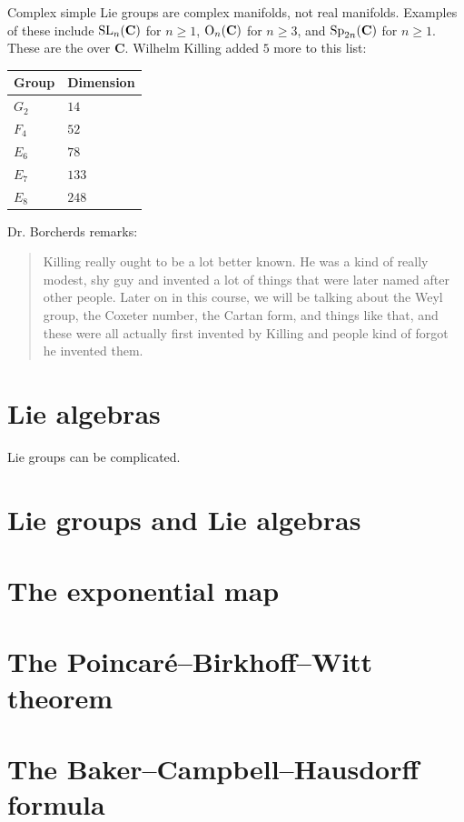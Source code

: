 \documentclass [11 pt, oneside] {article}
\begin{document}
Complex simple Lie groups are complex manifolds, not real manifolds. Examples of these include $\operatorname{SL}_{n}(\mathbf{C})$ for $n\ge 1$, $\operatorname{O}_{n}(\mathbf{C})$ for $n\ge 3$, and $\operatorname{Sp}_{2n}(\mathbf{C})$ for $n\ge 1$. These are the  over $\mathbf{C}$.
Wilhelm Killing added $5$ more to this list:
\begin{center}
\begin{tabular}{ll}
    Group & Dimension\\
    \midrule
    $G_2$ & $14$\\
    $F_4$ & $52$\\
    $E_6$ & $78$\\
    $E_7$ & $133$\\
    $E_8$ & $248$
\end{tabular}
\end{center}
Dr. Borcherds remarks:
\begin{quote}
	\small Killing really ought to be a lot better known. He was a kind of really modest, shy guy and invented a lot of things that were later named after other people. Later on in this course, we will be talking about the Weyl group, the Coxeter number, the Cartan form, and things like that, and these were all actually first invented by Killing and people kind of forgot he invented them.
\end{quote}

\section {Lie algebras}
Lie groups can be complicated.

\iffalse
\section {Lie groups and Lie algebras}

\section {The exponential map}

\section {The Poincar\'e--Birkhoff--Witt theorem}

\section {The Baker--Campbell--Hausdorff formula}
\end{document}
